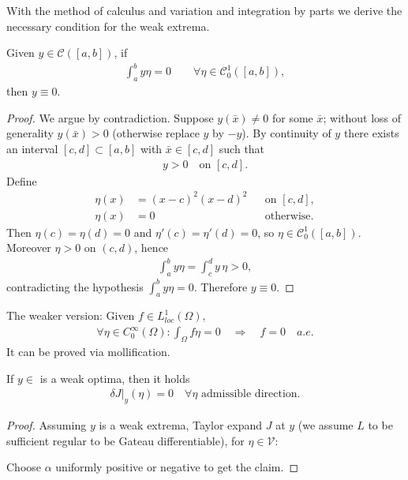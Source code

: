 With the method of calculus and variation and integration by parts we derive the necessary condition for the weak extrema. 

\begin{lemma}
Given $y \in \mathcal{C}([a, b])$, if
\begin{align*}
	\int_a^b y \eta = 0 \qquad \forall \eta \in \mathcal{C}^1_0([a, b]),
\end{align*}
then $y \equiv 0$.
\end{lemma}
\begin{proof}
	We argue by contradiction. Suppose $y(\bar{x}) \neq 0$ for some $\bar{x}$; without loss of generality $y(\bar{x}) > 0$ (otherwise replace $y$ by $-y$). By continuity of $y$ there exists an interval $[c, d] \subset [a, b]$ with $\bar{x} \in [c, d]$ such that
	\begin{align*}
		y > 0 \quad \text{on } [c, d].
	\end{align*}
	Define
	\begin{align*}
		\eta(x) &= (x - c)^2 (x - d)^2 &&\text{on } [c, d],\\
		\eta(x) &= 0 &&\text{otherwise.}
	\end{align*}
	Then $\eta(c) = \eta(d) = 0$ and $\eta'(c) = \eta'(d) = 0$, so $\eta \in \mathcal{C}^1_0([a, b])$. Moreover $\eta > 0$ on $(c, d)$, hence
	\begin{align*}
		\int_a^b y \eta = \int_c^d y\, \eta > 0,
	\end{align*}
	contradicting the hypothesis $\int_a^b y \eta = 0$. Therefore $y \equiv 0$.
\end{proof}
\begin{remark}
The weaker version:
Given $f \in L^1_{loc}(\Omega)$, 
\begin{align*}
	\forall \eta \in C_0^\infty(\Omega): \int_\Omega f \eta = 0 \quad\Rightarrow \quad f = 0\quad a.e.
\end{align*}
It can be proved via mollification. 	
\end{remark}

\begin{proposition}
	If $y \in $ is a weak optima, then it holds 
	\begin{align*}
		\delta J|_y(\eta) = 0 \quad \forall \eta \text{ admissible direction.} 
	\end{align*}
\end{proposition}
\begin{proof}
	Assuming $y$ is a weak extrema, Taylor expand $J$ at $y$ (we assume $L$ to be sufficient regular to be Gateau differentiable), for $\eta \in \mathcal{V}$: 

	Choose $\alpha$ uniformly positive or negative to get the claim.
\end{proof}

